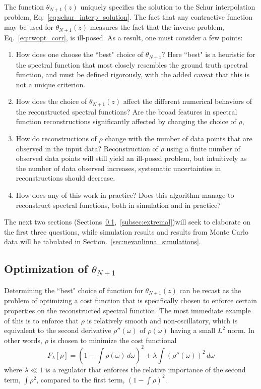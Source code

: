The function $\theta_{N + 1}(z)$ uniquely specifies the solution to the Schur interpolation problem, Eq.~\eqref{eq:schur_interp_solution}. The fact that any contractive function may be used for $\theta_{N + 1}(z)$ measures the fact that the inverse problem, Eq.~\eqref{eq:twopt_corr}, is ill-posed. As a result, one must consider a few points:
\begin{enumerate}
    \item How does one choose the ``best" choice of $\theta_{N + 1}$? Here ``best" is a heuristic for the spectral function that most closely resembles the ground truth spectral function, and must be defined rigorously, with the added caveat that this is not a unique criterion. 
    
    \item How does the choice of $\theta_{N + 1}(z)$ affect the different numerical behaviors of the reconstructed spectral functions? Are the broad features in spectral function reconstructions significantly affected by changing the choice of $\rho$, 
    
    \item How do reconstructions of $\rho$ change with the number of data points that are observed in the input data? Reconstruction of $\rho$ using a finite number of observed data points will still yield an ill-posed problem, but intuitively as the number of data observed increases, systematic uncertainties in reconstructions should decrease.

    \item How does any of this work in practice? Does this algorithm manage to reconstruct spectral functions, both in simulation and in practice?
\end{enumerate}
The next two sections (Sections~\ref{subsec:hardy_basis},~\ref{subsec:extremal})will seek to elaborate on the first three questions, while simulation results and results from Monte Carlo data will be tabulated in Section.~\ref{sec:nevanlinna_simulations}. 

\subsection{Optimization of $\theta_{N+1}$}
\label{subsec:hardy_basis}

Determining the ``best" choice of function for $\theta_{N+1}(z)$ can be recast as the problem of optimizing a cost function that is specifically chosen to enforce certain properties on the reconstructed spectral function. The most immediate example of this is to enforce that $\rho$ is relatively smooth and non-oscillatory, which is equivalent to the second derivative $\rho''(\omega)$ of $\rho(\omega)$ having a small $L^2$ norm. In other words, $\rho$ is chosen to minimize the cost functional
\begin{equation}
    F_{\lambda}[\rho] = \left( 1 - \int \rho(\omega)\,d\omega \right)^2 + \lambda \int \left( \rho''(\omega) \right)^2\,d\omega
\end{equation}
where $\lambda\ll 1$ is a regulator that enforces the relative importance of the second term, $\int \rho^2$, compared to the first term, $(1 - \int \rho)^2$. 

